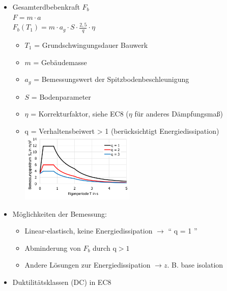 \documentclass[fleqn,twoside]{article}
\begin{document}
\begin{itemize}
            \item Gesamterdbebenkraft $F_b$\\
                $F=m\cdot a$\\
                $F_b(T_1) = m \cdot a_g \cdot S \cdot \frac{2,5}{q} \cdot \eta$
                    \begin{itemize}
                        \item $T_1$ = Grundschwingungsdauer Bauwerk
                        \item $m$ = Gebäudemasse
                        \item $a_g$ = Bemessungswert der Spitzbodenbeschleunigung
                        \item $S$ = Bodenparameter
                        \item $\eta$ = Korrekturfaktor, siehe EC8 ($\eta$ für anderes Dämpfungsmaß)
                        \item q = Verhaltensbeiwert > 1 (berücksichtigt Energiedissipation)\\
                            \includegraphics[width=0.45\textwidth]{Grafiken/Erdbeben/Verhaltensbeiwert.png}
                            
                    \end{itemize}

            \item Möglichkeiten der Bemessung:
                \begin{itemize}
                    \item Linear-elastisch, keine Energiedissipation
                        $\rightarrow$ \enquote{ q = 1 }
                    \item Abminderung von $F_b$ durch $\mathrm{q}>1$
                    \item Andere Lösungen zur Energiedissipation
                        $\rightarrow z$. B. base isolation
                \end{itemize}

            \item Duktilitätsklassen (DC) in EC8
                

\end{itemize}
\end{document}
